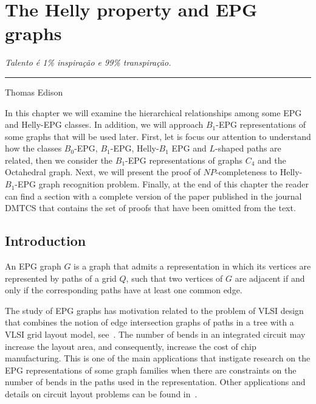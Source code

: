 \chapter{The Helly property and EPG graphs}\label{cap:capiii}

\begin{flushright}
\begin{minipage}[t][0cm][b]{0.47\textwidth}
\emph{
Talento é 1\% inspiração e 99\% transpiração. }
\end{minipage}

\rule[0cm]{7cm}{0.03cm}%

Thomas Edison
\end{flushright}


In this chapter we will examine the hierarchical relationships among some EPG and Helly-EPG classes. In addition, we will approach $ B_1$-EPG representations of some graphs that will be used later. First, let is focus our attention to understand how the classes $B_0$-EPG, $B_1$-EPG,  Helly-$B_1$ EPG and  $L$-shaped paths are related, then we consider the $ B_1$-EPG representations of graphs $C_4 $ and the Octahedral graph. Next, we will present the proof of $NP$-completeness to Helly-$B_1$-EPG graph recognition problem. Finally, at the end of this chapter the reader can find a section with a complete version of the paper published in the journal DMTCS that contains the set of proofs that have been omitted from the text.


\section{Introduction}
An EPG graph $G$ is a graph that admits a representation in which its vertices are represented by paths of a grid $Q$, such that two vertices of $G$ are adjacent if and only if the corresponding paths have at least one common edge.

The study of EPG graphs has motivation related to the problem of VLSI design that combines the notion of edge intersection graphs of paths in a  tree with a  VLSI  grid layout model, see~\cite{golumbic2009}. The number of bends in an integrated circuit may increase the layout area, and consequently, increase the cost of chip manufacturing.
This is one of the main applications that instigate research on the EPG representations of some graph families when there are constraints on the number of bends in the paths used in the representation.
Other applications and details on circuit layout problems can be found in~\cite{bandy1990, molitor1991}.

